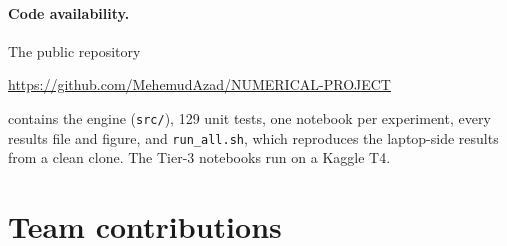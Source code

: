 \documentclass[sigconf]{acmart}
\begin{document}
\paragraph{Code availability.} The public repository
\begin{center}\url{https://github.com/MehemudAzad/NUMERICAL-PROJECT}\end{center}
contains the engine
(\texttt{src/}), 129 unit tests, one notebook per experiment, every results file and
figure, and \texttt{run\_all.sh}, which reproduces the laptop-side results from a
clean clone. The Tier-3 notebooks run on a Kaggle T4.




\appendix
\section{Team contributions}
\end{document}
